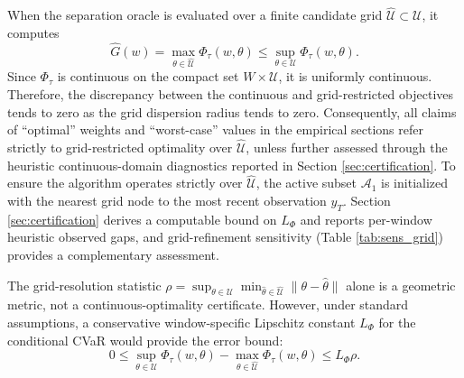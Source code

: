 \documentclass[smallextended]{svjour3}
\begin{document}
\begin{remark}
When the separation oracle is evaluated over a finite candidate grid $\widehat{\mathcal{U}} \subset \mathcal{U}$, it computes
\begin{equation}
\widehat{G}(w) = \max_{\theta \in \widehat{\mathcal{U}}} \Phi_\tau(w, \theta) \le \sup_{\theta \in \mathcal{U}} \Phi_\tau(w, \theta).
\end{equation}
Since $\Phi_\tau$ is continuous on the compact set $W \times \mathcal{U}$, it is uniformly continuous. Therefore, the discrepancy between the continuous and grid-restricted objectives tends to zero as the grid dispersion radius tends to zero. Consequently, all claims of ``optimal'' weights and ``worst-case'' values in the empirical sections refer strictly to grid-restricted optimality over $\widehat{\mathcal{U}}$, unless further assessed through the heuristic continuous-domain diagnostics reported in Section \ref{sec:certification}. To ensure the algorithm operates strictly over $\widehat{\mathcal{U}}$, the active subset $\mathcal{A}_1$ is initialized with the nearest grid node to the most recent observation $y_T$. Section \ref{sec:certification} derives a computable bound on $L_\Phi$ and reports per-window heuristic observed gaps, and grid-refinement sensitivity (Table \ref{tab:sens_grid}) provides a complementary assessment.


The grid-resolution statistic $\rho = \sup_{\theta \in \mathcal{U}} \min_{\hat{\theta} \in \widehat{\mathcal{U}}} \|\theta - \hat{\theta}\|$ alone is a geometric metric, not a continuous-optimality certificate. However, under standard assumptions, a conservative window-specific Lipschitz constant $L_\Phi$ for the conditional CVaR would provide the error bound:
\begin{equation}
0 \le \sup_{\theta \in \mathcal{U}} \Phi_\tau(w, \theta) - \max_{\theta \in \widehat{\mathcal{U}}} \Phi_\tau(w, \theta) \le L_\Phi \rho.
\end{equation}


\end{remark}
\end{document}

